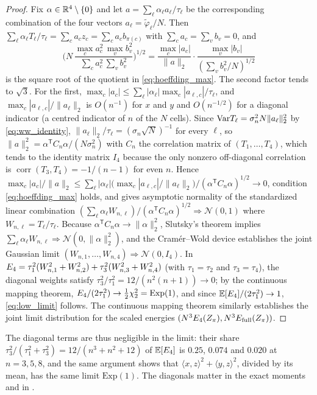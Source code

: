 \begin{proof}
Fix $\alpha\in\mathbb{R}^4\setminus\{0\}$ and let $a=\sum_\ell\alpha_\ell a_\ell/\tau_\ell$ be the corresponding combination of the four vectors $a_\ell=\tilde\varphi_\ell/N$.
Then $\sum_\ell\alpha_\ell T_\ell/\tau_\ell=\sum_ca_cz_c=\sum_ca_cb_{\pi(c)}$ with $\sum_ca_c=\sum_vb_v=0$, and
\[
\biggl(N\,\frac{\max_ca_c^2\,\max_vb_v^2}{\sum_ca_c^2\,\sum_vb_v^2}\biggr)^{1/2}=\frac{\max_c|a_c|}{\|a\|_2}\cdot\frac{\max_v|b_v|}{(\sum_vb_v^2/N)^{1/2}}
\]
is the square root of the quotient in \eqref{eq:hoeffding_max}.
The second factor tends to $\sqrt3$.
For the first, $\max_c|a_c|\le\sum_\ell|\alpha_\ell|\max_c|a_{\ell,c}|/\tau_\ell$, and $\max_c|a_{\ell,c}|/\|a_\ell\|_2$ is $O(n^{-1})$ for $x$ and $y$ and $O(n^{-1/2})$ for a diagonal indicator (a centred indicator of $n$ of the $N$ cells).
Since $\mathrm{Var} T_\ell=\sigma_n^2N\|a_\ell\|_2^2$ by \eqref{eq:ww_identity}, $\|a_\ell\|_2/\tau_\ell=(\sigma_n\sqrt N)^{-1}$ for every $\ell$, so $\|a\|_2^2=\alpha^{\mathsf T}C_n\alpha/(N\sigma_n^2)$ with $C_n$ the correlation matrix of $(T_1,\dots,T_4)$, which tends to the identity matrix $I_4$ because the only nonzero off-diagonal correlation is $\operatorname{corr}(T_3,T_4)=-1/(n-1)$ for even $n$.
Hence $\max_c|a_c|/\|a\|_2\le\sum_\ell|\alpha_\ell|\bigl(\max_c|a_{\ell,c}|/\|a_\ell\|_2\bigr)/(\alpha^{\mathsf T}C_n\alpha)^{1/2}\to0$, condition \eqref{eq:hoeffding_max} holds, and \cite[Thm.~4]{hoeffding1951} gives asymptotic normality of the standardized linear combination $(\sum_\ell\alpha_\ell W_{n,\ell})/(\alpha^{\mathsf T}C_n\alpha)^{1/2}\Rightarrow\mathcal N(0,1)$ where $W_{n,\ell}=T_\ell/\tau_\ell$.
Because $\alpha^{\mathsf T}C_n\alpha\to\|\alpha\|_2^2$, Slutsky's theorem implies $\sum_\ell\alpha_\ell W_{n,\ell}\Rightarrow\mathcal N(0,\|\alpha\|_2^2)$, and the Cram\'er--Wold device establishes the joint Gaussian limit $(W_{n,1},\dots,W_{n,4})\Rightarrow\mathcal N(0,I_4)$.
In $E_4=\tau_1^2(W_{n,1}^2+W_{n,2}^2)+\tau_3^2(W_{n,3}^2+W_{n,4}^2)$ (with $\tau_1=\tau_2$ and $\tau_3=\tau_4$), the diagonal weights satisfy $\tau_3^2/\tau_1^2=12/(n^2(n+1))\to0$; by the continuous mapping theorem, $E_4/(2\tau_1^2)\to\frac12\chi^2_2=\mathrm{Exp}(1)$, and since $\mathbb{E}[E_4]/(2\tau_1^2)\to1$, \eqref{eq:low_limit} follows. The continuous mapping theorem similarly establishes the joint limit distribution for the scaled energies $(N^3E_4(Z_\pi), N^3E_{\mathrm{full}}(Z_\pi))$.
\end{proof}

The diagonal terms are thus negligible in the limit: their share $\tau_3^2/(\tau_1^2+\tau_3^2)=12/(n^3+n^2+12)$ of $\mathbb{E}[E_4]$ is $0.25$, $0.074$ and $0.020$ at $n=3,5,8$, and the same argument shows that $\langle x,z\rangle^2+\langle y,z\rangle^2$, divided by its mean, has the same limit $\mathrm{Exp}(1)$.
The diagonals matter in the exact moments and in .


